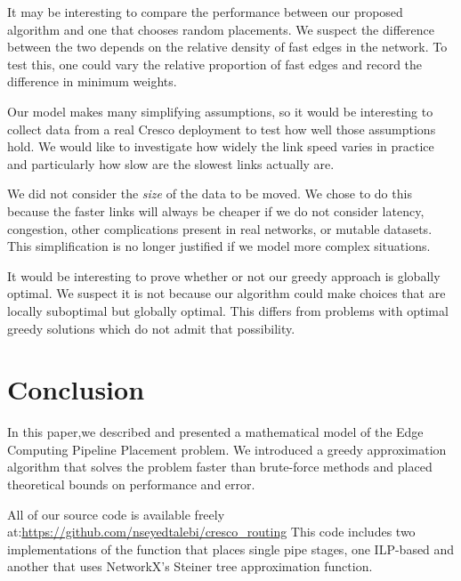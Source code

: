 \documentclass{article}
\begin{document}
 	 It may be interesting to compare the performance between our proposed algorithm and one that chooses random placements. We suspect the difference between the two depends on the relative density of fast edges in the network. To test this, one could vary the relative proportion of fast edges and record the difference in minimum weights.
 	 
 	 Our model makes many simplifying assumptions, so it would be interesting to collect data from a real Cresco deployment to test how well those assumptions hold. We would like to investigate how widely the link speed varies in practice and particularly how slow are the slowest links actually are.
 	 
 	 We did not consider the \textit{size} of the data to be moved. We chose to do this because the faster links will always be cheaper if we do not consider latency, congestion, other complications present in real networks, or mutable datasets. This simplification is no longer justified if we model more complex situations.
 	 
 	 It would be interesting to prove whether or not our greedy approach is globally optimal. We suspect it is not because our algorithm could make choices that are locally suboptimal but globally optimal. This differs from problems with optimal greedy solutions which do not admit that possibility.
 	  
 	 \section{Conclusion}
 	 In this paper,we described and presented a mathematical model of the Edge Computing Pipeline Placement problem. We introduced a greedy approximation algorithm that solves the problem faster than brute-force methods and placed theoretical bounds on performance and error.

	All of our source code is available freely at:\url{https://github.com/nseyedtalebi/cresco_routing} This code includes two implementations of the function that places single pipe stages, one ILP-based and another that uses NetworkX's Steiner tree approximation function.	
	
	
	
\end{document}
